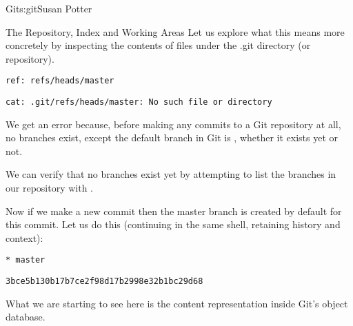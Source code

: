 \begin{aosachapter}{Git}{s:git}{Susan Potter}
\begin{aosasect1}{The Repository, Index and Working Areas}
Let us explore what this means more concretely by inspecting the contents of
files under the .git directory (or repository).

\begin{aosaitemize}
  \item {}
  \item {}
\begin{verbatim}
ref: refs/heads/master
\end{verbatim}
  \item {}
  \item {}
\begin{verbatim}
cat: .git/refs/heads/master: No such file or directory
\end{verbatim}
\end{aosaitemize}

We get an error because, before making any commits to a Git repository at
all, no branches exist, except the default branch in Git is ,
whether it exists yet or not.

We can verify that no branches exist yet by attempting to list the branches
in our repository with .

Now if we make a new commit then the master branch is created by default for
this commit. Let us do this (continuing in the same shell, retaining
history and context):

\begin{aosaitemize}
  \item {}
  \item {}
\begin{verbatim}
* master
\end{verbatim}
  \item {}
\begin{verbatim}
3bce5b130b17b7ce2f98d17b2998e32b1bc29d68
\end{verbatim}
  \item {}
\end{aosaitemize}

What we are starting to see here is the content representation inside Git's
object database.

\end{aosasect1}


\end{aosachapter}

